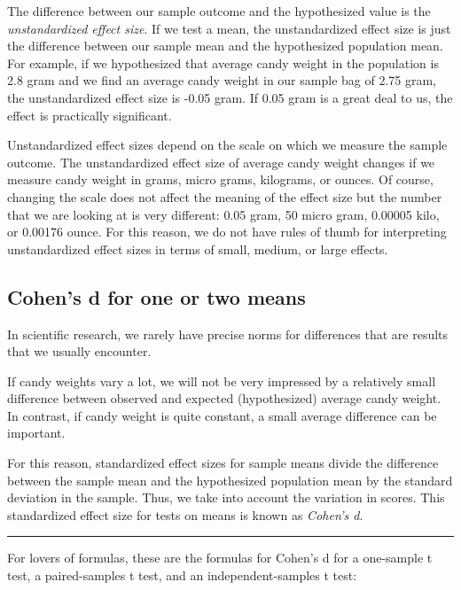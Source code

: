\documentclass[a4paper]{book}
\theoremstyle{definition}
\theoremstyle{definition}
\theoremstyle{definition}
\theoremstyle{remark}
\begin{document}
The difference between our sample outcome and the hypothesized value is
the \emph{unstandardized effect size}. If we test a mean, the
unstandardized effect size is just the difference between our sample
mean and the hypothesized population mean. For example, if we
hypothesized that average candy weight in the population is 2.8 gram and
we find an average candy weight in our sample bag of 2.75 gram, the
unstandardized effect size is -0.05 gram. If 0.05 gram is a great deal
to us, the effect is practically significant.

Unstandardized effect sizes depend on the scale on which we measure the
sample outcome. The unstandardized effect size of average candy weight
changes if we measure candy weight in grams, micro grams, kilograms, or
ounces. Of course, changing the scale does not affect the meaning of the
effect size but the number that we are looking at is very different:
0.05 gram, 50 micro gram, 0.00005 kilo, or 0.00176 ounce. For this
reason, we do not have rules of thumb for interpreting unstandardized
effect sizes in terms of small, medium, or large effects.

\subsection{Cohen's d for one or two
means}\label{cohens-d-for-one-or-two-means}

In scientific research, we rarely have precise norms for differences
that are results that we usually encounter.

If candy weights vary a lot, we will not be very impressed by a
relatively small difference between observed and expected (hypothesized)
average candy weight. In contrast, if candy weight is quite constant, a
small average difference can be important.

For this reason, standardized effect sizes for sample means divide the
difference between the sample mean and the hypothesized population mean
by the standard deviation in the sample. Thus, we take into account the
variation in scores. This standardized effect size for tests on means is
known as \emph{Cohen's d}.

\begin{center}\rule{0.5\linewidth}{\linethickness}\end{center}

For lovers of formulas, these are the formulas for Cohen's d for a
one-sample t test, a paired-samples t test, and an independent-samples t
test:
\end{document}

